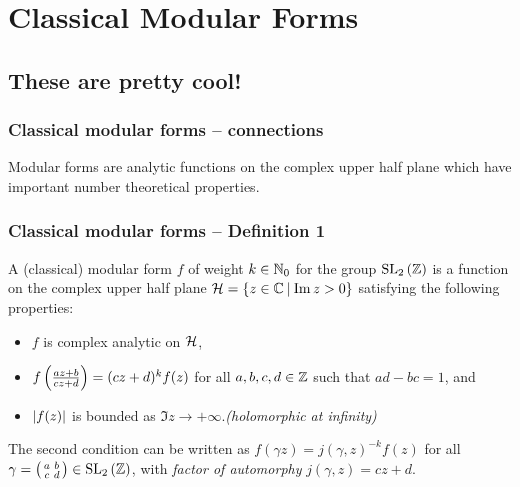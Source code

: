 \section{Classical Modular Forms}


\subsection{These are pretty cool!}

\begin{frame} \frametitle{Classical modular forms -- connections}
  Modular forms are analytic functions on the complex upper half plane which have important number theoretical properties. %
\end{frame}


\begin{frame} \frametitle{Classical modular forms -- Definition 1} \pause
  \begin{definition}
    A (classical) modular form $f$ of weight $k \in \NNO$ for the group $\SL[2]{\ZZ}$ is a function on the complex upper half plane $\HH = \setst{z \in \CC}{\Im{z} > 0}$ satisfying the following properties: \pause
    \begin{itemize}
      \item $f$ is complex analytic on $\HH$\pause,
      \item $f\parens{\frac{az+b}{cz+d}} = (cz+d)^{k} f(z)$ for all $a,b,c,d \in \ZZ$ such that $ad-bc = 1$\pause, and
      \item $\abs{f(z)}$ is bounded as $\Im{z} \to +\infty$.\pause \hfill \emph{(holomorphic at infinity)}
    \end{itemize}
  \end{definition}

  The second condition can be written as $f(\gamma z) = j(\gamma,z)^{-k} f(z)$ for all $\gamma = \parens{\begin{smallmatrix} a & b \\ c & d \end{smallmatrix}} \in \SL[2]{\ZZ}$, with \emph{factor of automorphy} $j(\gamma,z) = cz+d$.
\end{frame}



